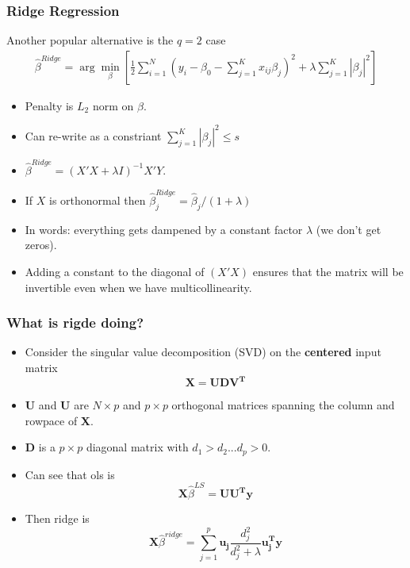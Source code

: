 \begin{frame}
    \frametitle{Ridge Regression}
    Another popular alternative is the $q=2$ case
    \begin{eqnarray*}
    \hat{\beta}^{Ridge} = \arg \min_{\beta} \left[\frac{1}{2} \sum_{i=1}^N (y_i - \beta_0 - \sum_{j=1}^K x_{ij} \beta_j)^2 + \lambda \sum_{j=1}^K | \beta_j|^2 \right]
    \end{eqnarray*}
    \begin{itemize}
    \item Penalty is $L_2$ norm on $\beta$.
    \item Can re-write as a constriant  $\sum_{j=1}^K | \beta_j|^2 \leq s$
    \item $\hat{\beta}^{Ridge} = (X'X + \lambda I )^{-1} X' Y$.
    \item If $X$ is orthonormal then $\hat{\beta}_{j}^{Ridge} =  \hat{\beta}_j /(1 +\lambda )$
    \item In words: everything gets dampened by a constant factor $\lambda$ (we don't get zeros).
    \item Adding a constant to the diagonal of $(X'X)$ ensures that the matrix will be invertible even when we have multicollinearity.
    \end{itemize}
\end{frame}

\begin{frame}
    \frametitle{What is rigde doing?}
    \begin{itemize}
        \item Consider the \alert{singular value decomposition} (SVD) on the \textbf{centered} input matrix $$\mathbf{X=UDV^T}$$
        \item \textbf{U} and \textbf{U} are $N \times p$ and $p \times p$ orthogonal matrices spanning the column and rowpace of \textbf{X}. 
        \item \textbf{D} is a $p \times p$ diagonal matrix with $d_1 > d_2 ...d_p > 0$. 
        \item Can see that ols is $$ \mathbf{X} \hat\beta^{LS} = \mathbf{UU^Ty} $$
        \item Then ridge is $$\mathbf{X}\hat\beta^{ridge} = \sum_{j=1}^p \mathbf{u_j}\frac{d_j^2}{d_j^2 + \lambda}\mathbf{u_j^Ty} $$
     \end{itemize}
\end{frame} 

